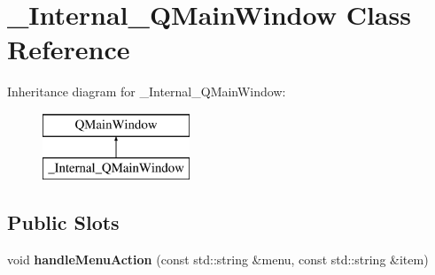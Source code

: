 \hypertarget{class__Internal__QMainWindow}{}\section{\+\_\+\+Internal\+\_\+\+Q\+Main\+Window Class Reference}
\label{class__Internal__QMainWindow}
Inheritance diagram for \+\_\+\+Internal\+\_\+\+Q\+Main\+Window\+:\begin{figure}[H]
\begin{center}
\leavevmode
\includegraphics[height=2.000000cm]{class__Internal__QMainWindow}
\end{center}
\end{figure}
\subsection*{Public Slots}
\begin{DoxyCompactItemize}
\item 
\mbox{\label{class__Internal__QMainWindow_ab41b9f106c52772e8d379f9140b56242}} 
void {\bfseries handle\+Menu\+Action} (const std\+::string \&menu, const std\+::string \&item)
\end{DoxyCompactItemize}
